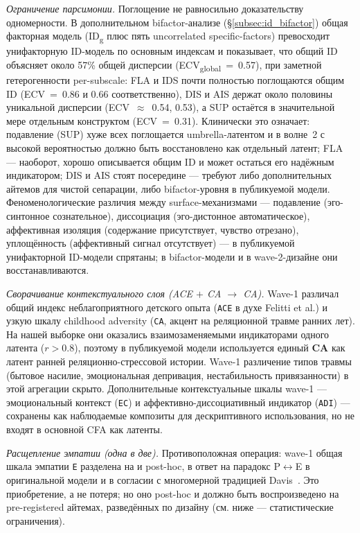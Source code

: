 \emph{Ограничение парсимонии.} Поглощение не равносильно доказательству одномерности. В дополнительном bifactor-анализе (§\ref{subsec:id_bifactor}) общая факторная модель (ID\textsubscript{g} плюс пять uncorrelated specific-factors) превосходит унифакторную ID-модель по основным индексам и показывает, что общий ID объясняет около 57\% общей дисперсии (ECV\textsubscript{global}~=~0.57), при заметной гетерогенности per-subscale: FLA и IDS почти полностью поглощаются общим ID (ECV~=~0.86 и 0.66 соответственно), DIS и AIS держат около половины уникальной дисперсии (ECV~$\approx$~0.54, 0.53), а SUP остаётся в значительной мере отдельным конструктом (ECV~=~0.31). Клинически это означает: подавление (SUP) хуже всех поглощается umbrella-латентом и в волне~2 с высокой вероятностью должно быть восстановлено как отдельный латент; FLA --- наоборот, хорошо описывается общим ID и может остаться его надёжным индикатором; DIS и AIS стоят посередине --- требуют либо дополнительных айтемов для чистой сепарации, либо bifactor-уровня в публикуемой модели. Феноменологические различия между surface-механизмами --- подавление (эго-синтонное сознательное), диссоциация (эго-дистонное автоматическое), аффективная изоляция (содержание присутствует, чувство отрезано), уплощённость (аффективный сигнал отсутствует) --- в публикуемой унифакторной ID-модели спрятаны; в bifactor-модели и в wave-2-дизайне они восстанавливаются.

\emph{Сворачивание контекстуального слоя (ACE $+$ CA $\to$ CA).} Wave-1 различал общий индекс неблагоприятного детского опыта (\texttt{ACE} в духе Felitti et al.) и узкую шкалу childhood adversity (\texttt{CA}, акцент на реляционной травме ранних лет). На нашей выборке они оказались взаимозаменяемыми индикаторами одного латента ($r > 0.8$), поэтому в публикуемой модели используется единый \textbf{CA} как латент ранней реляционно-стрессовой истории. Wave-1 различение типов травмы (бытовое насилие, эмоциональная депривация, нестабильность привязанности) в этой агрегации скрыто. Дополнительные контекстуальные шкалы wave-1 --- эмоциональный контекст (\texttt{EC}) и аффективно-диссоциативный индикатор (\texttt{ADI}) --- сохранены как наблюдаемые композиты для дескриптивного использования, но не входят в основной CFA как латенты.

\emph{Расщепление эмпатии (одна в две).} Противоположная операция: wave-1 общая шкала эмпатии \texttt{E} разделена на \EAF{} и \Ecog{} post-hoc, в ответ на парадокс P$\leftrightarrow$E в оригинальной модели и в согласии с многомерной традицией Davis~\citep{davis1983}. Это приобретение, а не потеря; но оно post-hoc и должно быть воспроизведено на pre-registered айтемах, разведённых по дизайну (см. ниже --- статистические ограничения).

